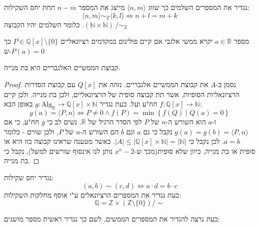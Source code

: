 \documentclass{tstextbook}
\begin{document}
\begin{definition}
נגדיר את המספרים השלמים כך שזוג \(\langle n,m \rangle\) מייצג את המספר \(n-m\) תחת יחס השקילות:
$$\langle n,m\rangle\sim_{\mathbb{Z}}\langle k,l\rangle\iff n+l=m+k$$
כלומר השלמים יהיו הקבוצה \(.(\mathbb{N}\times\mathbb{N})\,/\sim_{\mathbb{Z}}\)

\end{definition}
\begin{definition}
מספר \(a \in \mathbb{R}\) יקרא ממשי אלגבי אם קיים פולינום במקדמים רציונאליים \(P \in \mathbb{Q}[x] \setminus \{  0 \}\) כך ש-\(P(a)=0\)

\end{definition}
\begin{proposition}
קבוצת הממשיים האלגבריים היא בת מנייה.

\end{proposition}
\begin{proof}
נסמן ב-\(A\) את קבוצת הממשיים אלגבריים. נזהה את \(Q[x]\) עם קבוצת הסדרות הרציונאליות הסופיות, אשר תת קבוצה סופית של הרציונאליים, ולכן בת מנייה. ולכן קיים \(f:\mathbb{Q}[x]\to \mathbb{N}\) חח"ע ועל.
כעת נגדיר \(g:\mathrm{Alg}_{\mathbb{R}}\to \mathbb{Q}[x] \times \mathbb{N}\) באופן הבא:
$$g(a)=\langle P,n \rangle \iff P\neq 0\land f(P)=\min\left\{  f(Q)\mid Q(a)=0  \right\}$$
ו-\(a\) הוא השורש ה-\(n\) של \(P\) לפי הסדר הרגיל של \(\mathbb{R}\). נשים לב כי \(g\) חח"ע, כי אם \(g(a)=g(b)=\langle P,n \rangle\) נקבל כי גם \(a\) וגם \(b\) הם השורש ה-\(n\) של \(P\), ולכן שווים - כלומר \(a=b\). לכן נקבל כי \(|A|\leq |\mathbb{Q}[x]\times \mathbb{N}|=|\mathbb{N}|\). כאשר מטענה שראינו קבוצה כזו היא או סופית או בת מנייה, כיוון שלא סופית(מכך ש-\(x^{n}-2\) נותן לנו אינסוף שורשים למשל), נקבל כי בת מנייה. 

\end{proof}
\begin{definition}
נגדיר יחס שקילות:
$$(a,b)\sim (c,d)\iff a\cdot d=b\cdot c$$
כעת נגדיר את המספרים הרציונאלים ע"י אוסף מחלקות השקילות:
$$\mathbb{Q} =\mathbb{Z} \times \left( \mathbb{Z} \setminus  \{  0 \} \right) / \sim$$

\end{definition}
כעת נרצה להגדיר את המספרים הממשים, לשם כך נגדיר ראשית מספר מושגים:
\end{document}
